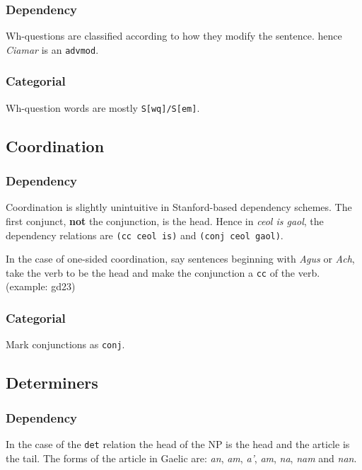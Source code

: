 \documentclass[a4paper]{article}
\begin{document}
\subsubsection{Dependency}
 Wh-questions are classified according to how they modify the sentence. hence \textit{Ciamar} is an \texttt{advmod}.

\subsubsection{Categorial}
 Wh-question words are mostly \texttt{S[wq]/S[em]}.

\subsection{Coordination}
\subsubsection{Dependency}

 Coordination is slightly unintuitive in Stanford-based dependency schemes. The first conjunct, \textbf{not} the conjunction, is the head. Hence in \textit{ceol is gaol}, the dependency relations are \texttt{(cc ceol is)} and \texttt{(conj ceol gaol)}.

 In the case of one-sided coordination, say sentences beginning with \textit{Agus} or \textit{Ach}, take the verb to be the head and make the conjunction a \texttt{cc} of the verb. (example: gd23)

\subsubsection{Categorial}

 Mark conjunctions as \texttt{conj}.





\subsection{Determiners}
\subsubsection{Dependency}
 In the case of the \texttt{det} relation the head of the NP is the head and the article is the tail. The forms of the article in Gaelic are: \textit{an}, \textit{am}, \textit{a'}, \textit{am}, \textit{na}, \textit{nam} and \textit{nan}.
\end{document}
